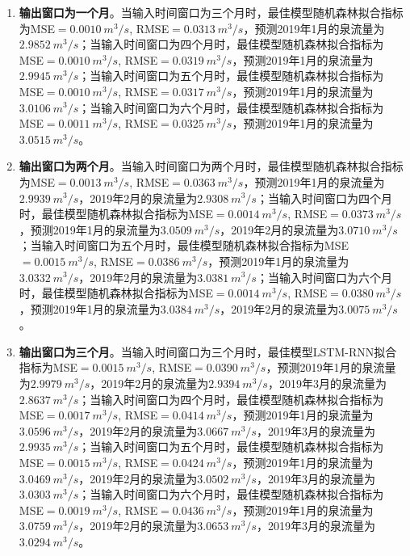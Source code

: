 \begin{enumerate}
    \begin{enumerate}
      \item \textbf{输出窗口为一个月}。当输入时间窗口为三个月时，最佳模型随机森林拟合指标为MSE$=\SI{0.0010}{m^{3}/s}$, RMSE$=\SI{0.0313}{m^{3}/s}$，预测2019年1月的泉流量为$\SI{2.9852}{m^{3}/s}$；当输入时间窗口为四个月时，最佳模型随机森林拟合指标为MSE$=\SI{0.0010}{m^{3}/s}$, RMSE$=\SI{0.0319}{m^{3}/s}$，预测2019年1月的泉流量为$\SI{2.9945}{m^{3}/s}$；当输入时间窗口为五个月时，最佳模型随机森林拟合指标为MSE$=\SI{0.0010}{m^{3}/s}$, RMSE$=\SI{0.0317}{m^{3}/s}$，预测2019年1月的泉流量为$\SI{3.0106}{m^{3}/s}$；当输入时间窗口为六个月时，最佳模型随机森林拟合指标为MSE$=\SI{0.0011}{m^{3}/s}$, RMSE$=\SI{0.0325}{m^{3}/s}$，预测2019年1月的泉流量为$\SI{3.0515}{m^{3}/s}$。
      \item \textbf{输出窗口为两个月}。当输入时间窗口为两个月时，最佳模型随机森林拟合指标为MSE$=\SI{0.0013}{m^{3}/s}$, RMSE$=\SI{0.0363}{m^{3}/s}$，预测2019年1月的泉流量为$\SI{2.9939}{m^{3}/s}$，2019年2月的泉流量为$\SI{2.9308}{m^{3}/s}$；当输入时间窗口为四个月时，最佳模型随机森林拟合指标为MSE$=\SI{0.0014}{m^{3}/s}$, RMSE$=\SI{0.0373}{m^{3}/s}$，预测2019年1月的泉流量为$\SI{3.0509}{m^{3}/s}$，2019年2月的泉流量为$\SI{3.0710}{m^{3}/s}$；当输入时间窗口为五个月时，最佳模型随机森林拟合指标为MSE$=\SI{0.0015}{m^{3}/s}$, RMSE$=\SI{0.0386}{m^{3}/s}$，预测2019年1月的泉流量为$\SI{3.0332}{m^{3}/s}$，2019年2月的泉流量为$\SI{3.0381}{m^{3}/s}$；当输入时间窗口为六个月时，最佳模型随机森林拟合指标为MSE$=\SI{0.0014}{m^{3}/s}$, RMSE$=\SI{0.0380}{m^{3}/s}$，预测2019年1月的泉流量为$\SI{3.0384}{m^{3}/s}$，2019年2月的泉流量为$\SI{3.0075}{m^{3}/s}$。
      \item \textbf{输出窗口为三个月}。当输入时间窗口为三个月时，最佳模型LSTM-RNN拟合指标为MSE$=\SI{0.0015}{m^{3}/s}$, RMSE$=\SI{0.0390}{m^{3}/s}$，预测2019年1月的泉流量为$\SI{2.9979}{m^{3}/s}$，2019年2月的泉流量为$\SI{2.9394}{m^{3}/s}$，2019年3月的泉流量为$\SI{2.8637}{m^{3}/s}$；当输入时间窗口为四个月时，最佳模型随机森林拟合指标为MSE$=\SI{0.0017}{m^{3}/s}$, RMSE$=\SI{0.0414}{m^{3}/s}$，预测2019年1月的泉流量为$\SI{3.0596}{m^{3}/s}$，2019年2月的泉流量为$\SI{3.0667}{m^{3}/s}$，2019年3月的泉流量为$\SI{2.9935}{m^{3}/s}$；当输入时间窗口为五个月时，最佳模型随机森林拟合指标为MSE$=\SI{0.0015}{m^{3}/s}$, RMSE$=\SI{0.0424}{m^{3}/s}$，预测2019年1月的泉流量为$\SI{3.0469}{m^{3}/s}$，2019年2月的泉流量为$\SI{3.0502}{m^{3}/s}$，2019年3月的泉流量为$\SI{3.0303}{m^{3}/s}$；当输入时间窗口为六个月时，最佳模型随机森林拟合指标为MSE$=\SI{0.0019}{m^{3}/s}$, RMSE$=\SI{0.0436}{m^{3}/s}$，预测2019年1月的泉流量为$\SI{3.0759}{m^{3}/s}$，2019年2月的泉流量为$\SI{3.0653}{m^{3}/s}$，2019年3月的泉流量为$\SI{3.0294}{m^{3}/s}$。

\end{enumerate}
\end{enumerate}
